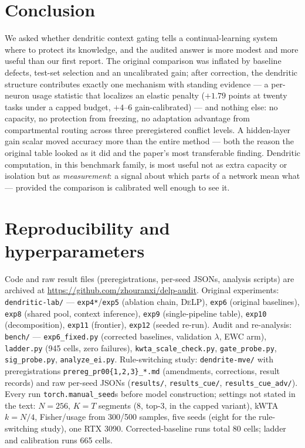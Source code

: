 \documentclass[conference]{IEEEtran}
\newcommand{\delp}{\textsc{DeLP}}
\begin{document}
\section{Conclusion}
We asked whether dendritic context gating tells a continual-learning system where to protect its
knowledge, and the audited answer is more modest and more useful than our first report. The
original comparison was inflated by baseline defects, test-set selection and an uncalibrated gain;
after correction, the dendritic structure contributes exactly one mechanism with standing evidence
--- a per-neuron usage statistic that localizes an elastic penalty ($+1.79$ points at twenty tasks
under a capped budget, $+4$--$6$ gain-calibrated) --- and nothing else:
no capacity, no protection from freezing, no adaptation advantage from compartmental routing
across three preregistered conflict levels. A hidden-layer gain scalar moved accuracy more than
the entire method --- both the reason the original table looked as it did and the paper's most
transferable finding. Dendritic computation, in this benchmark family, is most useful not as extra
capacity or isolation but as \emph{measurement}: a signal about which parts of a network mean
what --- provided the comparison is calibrated well enough to see it.

\appendices
\section{Reproducibility and hyperparameters}
Code and raw result files (preregistrations, per-seed JSONs, analysis scripts) are archived at
\url{https://github.com/zhouranxi/delp-audit}. Original experiments:
\texttt{dendritic-lab/} --- \texttt{exp4*}/\texttt{exp5} (ablation chain, \delp{}),
\texttt{exp6} (original baselines), \texttt{exp8} (shared pool, context inference),
\texttt{exp9} (single-pipeline table), \texttt{exp10} (decomposition), \texttt{exp11} (frontier),
\texttt{exp12} (seeded re-run). Audit and re-analysis: \texttt{bench/} ---
\texttt{exp6\_fixed.py} (corrected baselines, validation $\lambda$, EWC arm),
\texttt{ladder.py} (945 cells, zero failures), \texttt{kwta\_scale\_check.py},
\texttt{gate\_probe.py}, \texttt{sig\_probe.py}, \texttt{analyze\_ei.py}. Rule-switching study:
\texttt{dendrite-mve/} with preregistrations \texttt{prereg\_pr00\{1,2,3\}\_*.md} (amendments,
corrections, result records) and raw per-seed JSONs (\texttt{results/}, \texttt{results\_cue/},
\texttt{results\_cue\_adv/}). Every run \texttt{torch.manual\_seed}s before model construction;
settings not stated in the text: $N=256$, $K=T$ segments ($8$, top-3, in the capped variant),
kWTA $k=N/4$, Fisher/usage from 300/500 samples, five seeds (eight for the rule-switching study),
one RTX 3090. Corrected-baseline runs total 80 cells; ladder and calibration runs 665 cells.
\end{document}
